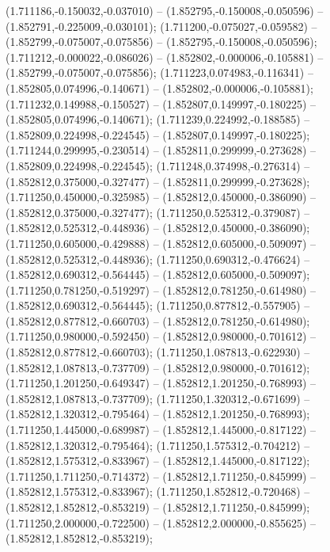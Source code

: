  (1.711186,-0.150032,-0.037010) -- (1.852795,-0.150008,-0.050596) -- (1.852791,-0.225009,-0.030101);
 (1.711200,-0.075027,-0.059582) -- (1.852799,-0.075007,-0.075856) -- (1.852795,-0.150008,-0.050596);
 (1.711212,-0.000022,-0.086026) -- (1.852802,-0.000006,-0.105881) -- (1.852799,-0.075007,-0.075856);
 (1.711223,0.074983,-0.116341) -- (1.852805,0.074996,-0.140671) -- (1.852802,-0.000006,-0.105881);
 (1.711232,0.149988,-0.150527) -- (1.852807,0.149997,-0.180225) -- (1.852805,0.074996,-0.140671);
 (1.711239,0.224992,-0.188585) -- (1.852809,0.224998,-0.224545) -- (1.852807,0.149997,-0.180225);
 (1.711244,0.299995,-0.230514) -- (1.852811,0.299999,-0.273628) -- (1.852809,0.224998,-0.224545);
 (1.711248,0.374998,-0.276314) -- (1.852812,0.375000,-0.327477) -- (1.852811,0.299999,-0.273628);
 (1.711250,0.450000,-0.325985) -- (1.852812,0.450000,-0.386090) -- (1.852812,0.375000,-0.327477);
 (1.711250,0.525312,-0.379087) -- (1.852812,0.525312,-0.448936) -- (1.852812,0.450000,-0.386090);
 (1.711250,0.605000,-0.429888) -- (1.852812,0.605000,-0.509097) -- (1.852812,0.525312,-0.448936);
 (1.711250,0.690312,-0.476624) -- (1.852812,0.690312,-0.564445) -- (1.852812,0.605000,-0.509097);
 (1.711250,0.781250,-0.519297) -- (1.852812,0.781250,-0.614980) -- (1.852812,0.690312,-0.564445);
 (1.711250,0.877812,-0.557905) -- (1.852812,0.877812,-0.660703) -- (1.852812,0.781250,-0.614980);
 (1.711250,0.980000,-0.592450) -- (1.852812,0.980000,-0.701612) -- (1.852812,0.877812,-0.660703);
 (1.711250,1.087813,-0.622930) -- (1.852812,1.087813,-0.737709) -- (1.852812,0.980000,-0.701612);
 (1.711250,1.201250,-0.649347) -- (1.852812,1.201250,-0.768993) -- (1.852812,1.087813,-0.737709);
 (1.711250,1.320312,-0.671699) -- (1.852812,1.320312,-0.795464) -- (1.852812,1.201250,-0.768993);
 (1.711250,1.445000,-0.689987) -- (1.852812,1.445000,-0.817122) -- (1.852812,1.320312,-0.795464);
 (1.711250,1.575312,-0.704212) -- (1.852812,1.575312,-0.833967) -- (1.852812,1.445000,-0.817122);
 (1.711250,1.711250,-0.714372) -- (1.852812,1.711250,-0.845999) -- (1.852812,1.575312,-0.833967);
 (1.711250,1.852812,-0.720468) -- (1.852812,1.852812,-0.853219) -- (1.852812,1.711250,-0.845999);
 (1.711250,2.000000,-0.722500) -- (1.852812,2.000000,-0.855625) -- (1.852812,1.852812,-0.853219);
